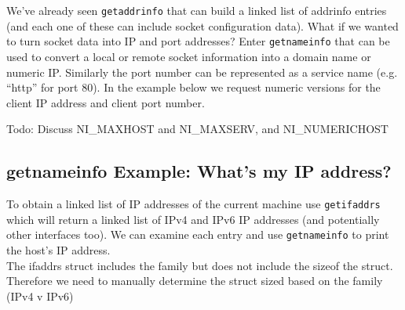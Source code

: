 \begin{Shaded}
\begin{Highlighting}[]
     
      
\end{Highlighting}
\end{Shaded}

We've already seen \texttt{getaddrinfo} that can build a linked list of
addrinfo entries (and each one of these can include socket configuration
data). What if we wanted to turn socket data into IP and port addresses?
Enter \texttt{getnameinfo} that can be used to convert a local or remote
socket information into a domain name or numeric IP. Similarly the port
number can be represented as a service name (e.g. ``http'' for port 80).
In the example below we request numeric versions for the client IP
address and client port number.

\begin{Shaded}
\begin{Highlighting}[]
      
     \NormalTok{host[}\NormalTok{], port[}\NormalTok{];}
     
\end{Highlighting}
\end{Shaded}

Todo: Discuss NI\_MAXHOST and NI\_MAXSERV, and NI\_NUMERICHOST

\subsection{getnameinfo Example: What's my IP
address?}\label{getnameinfo-example-whats-my-ip-address}

To obtain a linked list of IP addresses of the current machine use
\texttt{getifaddrs} which will return a linked list of IPv4 and IPv6 IP
addresses (and potentially other interfaces too). We can examine each
entry and use \texttt{getnameinfo} to print the host's IP address.\\The
ifaddrs struct includes the family but does not include the sizeof the
struct. Therefore we need to manually determine the struct sized based
on the family (IPv4 v IPv6)

